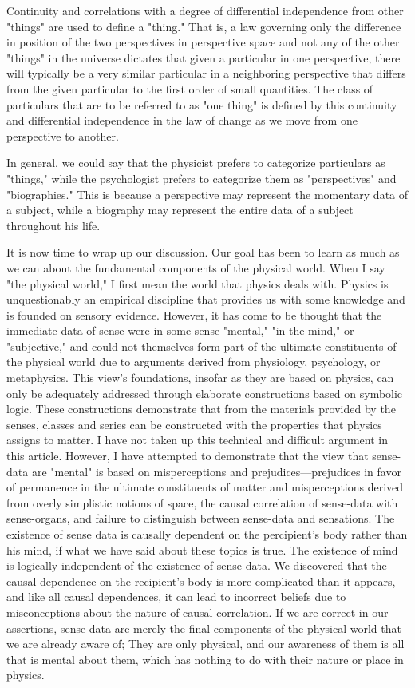\documentclass[a4paper,12pt]{book}[2004/02/16]
\theoremstyle{ilemma}
\theoremstyle{itheorem}
\theoremstyle{iother}
\theoremstyle{icorollary}
\theoremstyle{numcorollary}
\theoremstyle{idefinition}
\begin{document}
Continuity and correlations with a degree of differential independence from other "things" are used to define a "thing." That is, a law governing only the difference in position of the two perspectives in perspective space and not any of the other "things" in the universe dictates that given a particular in one perspective, there will typically be a very similar particular in a neighboring perspective that differs from the given particular to the first order of small quantities. The class of particulars that are to be referred to as "one thing" is defined by this continuity and differential independence in the law of change as we move from one perspective to another.

In general, we could say that the physicist prefers to categorize particulars as "things," while the psychologist prefers to categorize them as "perspectives" and "biographies." This is because a perspective may represent the momentary data of a subject, while a biography may represent the entire data of a subject throughout his life.

It is now time to wrap up our discussion. Our goal has been to learn as much as we can about the fundamental components of the physical world. When I say "the physical world," I first mean the world that physics deals with. Physics is unquestionably an empirical discipline that provides us with some knowledge and is founded on sensory evidence. However, it has come to be thought that the immediate data of sense were in some sense "mental," "in the mind," or "subjective," and could not themselves form part of the ultimate constituents of the physical world due to arguments derived from physiology, psychology, or metaphysics. This view's foundations, insofar as they are based on physics, can only be adequately addressed through elaborate constructions based on symbolic logic. These constructions demonstrate that from the materials provided by the senses, classes and series can be constructed with the properties that physics assigns to matter. I have not taken up this technical and difficult argument in this article. However, I have attempted to demonstrate that the view that sense-data are "mental" is based on misperceptions and prejudices—prejudices in favor of permanence in the ultimate constituents of matter and misperceptions derived from overly simplistic notions of space, the causal correlation of sense-data with sense-organs, and failure to distinguish between sense-data and sensations. The existence of sense data is causally dependent on the percipient's body rather than his mind, if what we have said about these topics is true. The existence of mind is logically independent of the existence of sense data. We discovered that the causal dependence on the recipient's body is more complicated than it appears, and like all causal dependences, it can lead to incorrect beliefs due to misconceptions about the nature of causal correlation.
If we are correct in our assertions, sense-data are merely the final components of the physical world that we are already aware of; They are only physical, and our awareness of them is all that is mental about them, which has nothing to do with their nature or place in physics.
\end{document}
